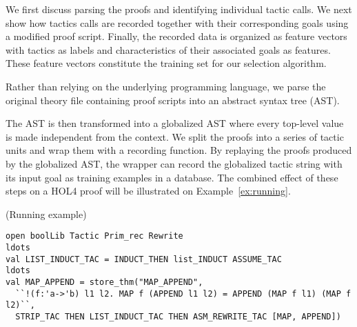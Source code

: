\documentclass[runningheads,a4paper,draft]{svjour3}
\def\holfour{\textsf{HOL4}\xspace}
\begin{document}
We first discuss parsing the proofs and identifying 
individual tactic calls. We next show how tactics calls are recorded together 
with their corresponding goals using a modified proof script.
Finally, the recorded data is organized as feature vectors with tactics as 
labels and characteristics of their associated goals as features. 
These feature vectors constitute the training set for our selection algorithm.

Rather than relying on the underlying programming language, we parse the
original theory file containing proof scripts into an
abstract syntax tree (AST).


 The AST is then transformed into a globalized AST
where every top-level value is made independent from
the context.  We 
split the proofs into a series of tactic units and wrap them 
with a recording function.
By replaying the proofs produced by the globalized AST, the wrapper can
record the globalized tactic string with its input goal as training examples in
a database.
The combined effect of these steps on a \holfour proof will be illustrated on 
Example~\ref{ex:running}.

\begin{example}\label{ex:running}(Running example)
\small
\begin{lstlisting}[language=SMLSmall,frame=tb]
open boolLib Tactic Prim_rec Rewrite
ldots
val LIST_INDUCT_TAC = INDUCT_THEN list_INDUCT ASSUME_TAC
ldots
val MAP_APPEND = store_thm("MAP_APPEND",
  ``!(f:'a->'b) l1 l2. MAP f (APPEND l1 l2) = APPEND (MAP f l1) (MAP f l2)``,
  STRIP_TAC THEN LIST_INDUCT_TAC THEN ASM_REWRITE_TAC [MAP, APPEND])
\end{lstlisting}
\end{example} 
\end{document}

